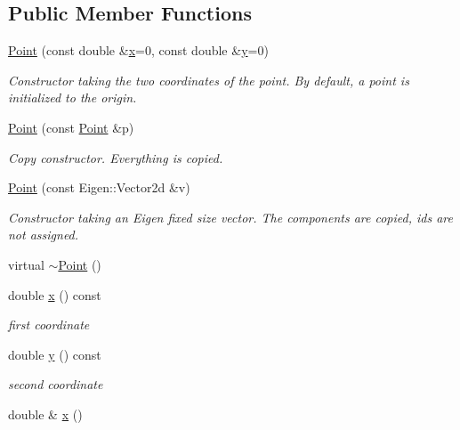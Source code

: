 \subsection*{Public Member Functions}
\begin{DoxyCompactItemize}
\item 
\hyperlink{classTspeed_1_1Geo_1_1Point_a1d341df68317135dd9f7f39a172fd2d6}{Point} (const double \&\hyperlink{classTspeed_1_1Geo_1_1Point_a658f2ac4d36ea76832a36d8a4b0bcf96}{x}=0, const double \&\hyperlink{classTspeed_1_1Geo_1_1Point_a1424ccbaba0dbed5605d99f4718774ed}{y}=0)
\begin{DoxyCompactList}\small\item\em Constructor taking the two coordinates of the point. By default, a point is initialized to the origin. \end{DoxyCompactList}\item 
\hyperlink{classTspeed_1_1Geo_1_1Point_a2d4ba9608644de1238c56dd570f2891a}{Point} (const \hyperlink{classTspeed_1_1Geo_1_1Point}{Point} \&p)
\begin{DoxyCompactList}\small\item\em Copy constructor. Everything is copied. \end{DoxyCompactList}\item 
\hyperlink{classTspeed_1_1Geo_1_1Point_a6a35bb9a5f7842697aae1195e6483be1}{Point} (const Eigen\-::\-Vector2d \&v)
\begin{DoxyCompactList}\small\item\em Constructor taking an Eigen fixed size vector. The components are copied, ids are not assigned. \end{DoxyCompactList}\item 
virtual \hyperlink{classTspeed_1_1Geo_1_1Point_a473a872a53b39b9ff91d4030c5a23003}{$\sim$\-Point} ()
\item 
double \hyperlink{classTspeed_1_1Geo_1_1Point_a658f2ac4d36ea76832a36d8a4b0bcf96}{x} () const 
\begin{DoxyCompactList}\small\item\em first coordinate \end{DoxyCompactList}\item 
double \hyperlink{classTspeed_1_1Geo_1_1Point_a1424ccbaba0dbed5605d99f4718774ed}{y} () const 
\begin{DoxyCompactList}\small\item\em second coordinate \end{DoxyCompactList}\item 
double \& \hyperlink{classTspeed_1_1Geo_1_1Point_a69ed6e602a1419a1afa1eaabd8abe911}{x} ()

\end{DoxyCompactItemize}
